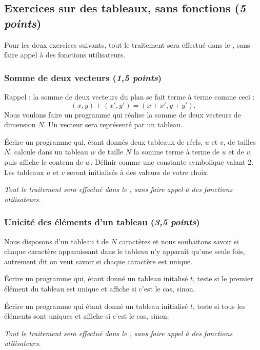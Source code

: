 \subsection{Exercices sur des tableaux, sans fonctions (\emph{5 points})}
Pour les deux exercices suivants, tout le traitement sera effectué dans
le , sans faire appel à des fonctions utilisateurs.

\subsubsection{Somme de deux vecteurs (\emph{1,5 points})}

Rappel : la somme de deux vecteurs du plan se fait terme à terme comme
ceci :
\[
(x, y) + (x', y') = (x + x', y + y').
\]
Nous voulons faire un
programme qui réalise la somme de deux vecteurs de dimension $N$. Un
vecteur sera représenté par un tableau.


Écrire un programme qui, étant donnés deux tableaux de réels, $u$ et
$v$, de tailles $N$, calcule dans un tableau $w$ de taille $N$ la somme
terme à terme de $u$ et de $v$, puis affiche le contenu de $w$. Définir
 comme une constante symbolique valant 2. Les tableaux $u$ et $v$
seront initialisés à des valeurs de votre choix.

\emph{Tout le traitement sera effectué dans le , sans faire
  appel à des fonctions utilisateurs.}



\subsubsection{Unicité des éléments d'un tableau (\emph{3,5 points})}

Nous disposons d'un tableau $t$ de $N$ caractères et nous souhaitons
savoir si chaque caractère apparaissant dans le tableau n'y apparaît
qu'une seule fois, autrement dit on veut savoir si chaque caractère
est unique.

\begin{newenu}
\item Écrire un programme qui, étant donné un tableau initalisé $t$,
  teste si le premier élément du tableau est unique et affiche
   si c'est le cas,  sinon.

\item  Écrire un programme qui étant donné un tableau initialisé $t$, teste
  si tous les éléments sont uniques et affiche  si c'est le
  cas,  sinon.
\end{newenu}

\emph{Tout le traitement
sera effectué dans le , sans faire appel à des fonctions
utilisateurs.}

